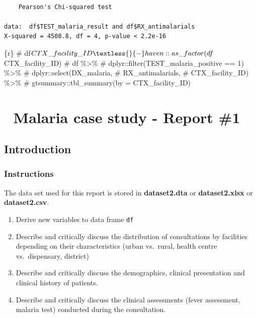 \documentclass[
  letterpaper,
  DIV=11,
  numbers=noendperiod,
  oneside]{scrreprt}
\newenvironment{Shaded}{\begin{snugshade}}{\end{snugshade}}
\newcommand{\CommentTok}[1]{\textcolor[rgb]{0.37,0.37,0.37}{#1}}
\newcommand{\InformationTok}[1]{\textcolor[rgb]{0.37,0.37,0.37}{#1}}
\providecommand{\tightlist}{%
  \setlength{\itemsep}{0pt}\setlength{\parskip}{0pt}}\usepackage{longtable,booktabs,array}
\begin{document}
\begin{verbatim}

    Pearson's Chi-squared test

data:  df$TEST_malaria_result and df$RX_antimalarials
X-squared = 4508.8, df = 4, p-value < 2.2e-16
\end{verbatim}

\begin{Shaded}
\begin{Highlighting}[]
\InformationTok{\textasciigrave{}\textasciigrave{}\textasciigrave{}\{r\}}
\CommentTok{\# df$CTX\_facility\_ID \textless{}{-} haven::as\_factor(df$CTX\_facility\_ID) }
\CommentTok{\# df \%\textgreater{}\%}
\CommentTok{\#   dplyr::filter(TEST\_malaria\_positive == 1) \%\textgreater{}\%}
\CommentTok{\#   dplyr::select(DX\_malaria,}
\CommentTok{\#                 RX\_antimalarials,}
\CommentTok{\#                 CTX\_facility\_ID) \%\textgreater{}\%}
\CommentTok{\#   gtsummary::tbl\_summary(by = CTX\_facility\_ID)}
\InformationTok{\textasciigrave{}\textasciigrave{}\textasciigrave{}}
\end{Highlighting}
\end{Shaded}

\hypertarget{malaria-case-study---report-1}{%
\chapter{\texorpdfstring{{📙} Malaria case study - Report
\#1}{📙 Malaria case study - Report \#1}}\label{malaria-case-study---report-1}}

\hypertarget{introduction-12}{%
\section{Introduction}\label{introduction-12}}

\hypertarget{instructions}{%
\subsection{Instructions}\label{instructions}}

The data set used for this report is stored in \textbf{dataset2.dta} or
\textbf{dataset2.xlsx} or \textbf{dataset2.csv}.

\begin{enumerate}
\def\labelenumi{\arabic{enumi}.}
\tightlist
\item
  Derive new variables to data frame \texttt{df}
\item
  Describe and critically discuss the distribution of consultations by
  facilities depending on their characteristics (urban vs.~rural, health
  centre vs.~dispensary, district)
\item
  Describe and critically discuss the demographics, clinical
  presentation and clinical history of patients.
\item
  Describe and critically discuss the clinical assessments (fever
  assessment, malaria test) conducted during the consultation.
\end{enumerate}
\end{document}
